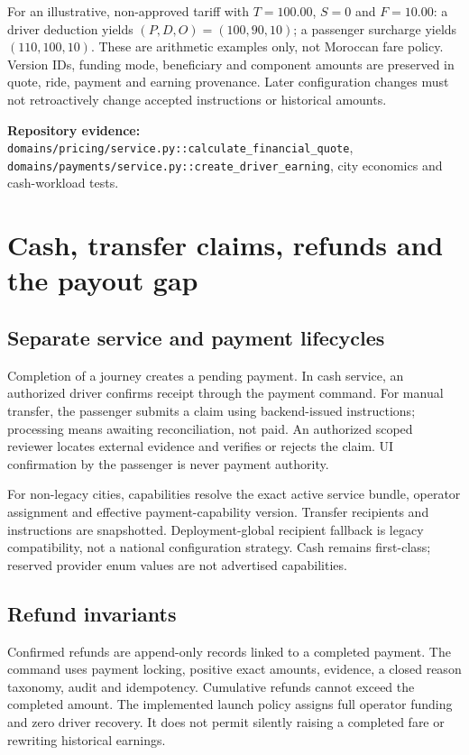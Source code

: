 \documentclass[11pt,a4paper]{article}
\newcommand{\src}[1]{{\small\nolinkurl{#1}}}
\newcommand{\evidence}[1]{\par\textbf{Repository evidence:} #1\par}
\begin{document}
For an illustrative, non-approved tariff with $T=100.00$, $S=0$ and $F=10.00$:
a driver deduction yields $(P,D,O)=(100,90,10)$; a passenger surcharge yields
$(110,100,10)$. These are arithmetic examples only, not Moroccan fare policy.
Version IDs, funding mode, beneficiary and component amounts are preserved in
quote, ride, payment and earning provenance. Later configuration changes must
not retroactively change accepted instructions or historical amounts.
\evidence{\src{domains/pricing/service.py::calculate_financial_quote},
\src{domains/payments/service.py::create_driver_earning}, city economics and cash-workload tests.}

\section{Cash, transfer claims, refunds and the payout gap}
\subsection{Separate service and payment lifecycles}
Completion of a journey creates a pending payment. In cash service, an authorized
driver confirms receipt through the payment command. For manual transfer,
the passenger submits a claim using backend-issued instructions; processing
means awaiting reconciliation, not paid. An authorized scoped reviewer locates
external evidence and verifies or rejects the claim. UI confirmation by the
passenger is never payment authority.

For non-legacy cities, capabilities resolve the exact active service bundle,
operator assignment and effective payment-capability version. Transfer recipients
and instructions are snapshotted. Deployment-global recipient fallback is
legacy compatibility, not a national configuration strategy. Cash remains
first-class; reserved provider enum values are not advertised capabilities.

\subsection{Refund invariants}
Confirmed refunds are append-only records linked to a completed payment. The
command uses payment locking, positive exact amounts, evidence, a closed reason
taxonomy, audit and idempotency. Cumulative refunds cannot exceed the completed
amount. The implemented launch policy assigns full operator funding and zero
driver recovery. It does not permit silently raising a completed fare or
rewriting historical earnings.
\end{document}

